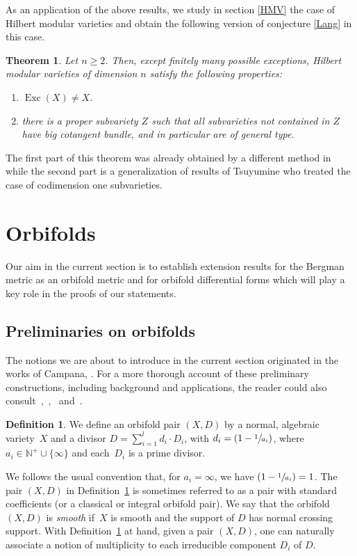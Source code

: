 \documentclass[10pt]{amsart}
\theoremstyle{plain}
\newtheorem{thma}{Theorem}
\theoremstyle{definition}
\newtheorem{definition}[theorem]{Definition}
\numberwithin{equation}{theorem}
\newenvironment{enumerateth}
{\bgroup\def\theenumi{\thetheorem.\arabic{enumi}}
\begin{enumerate}
\setcounter{enumi}{\value{equation}}}
{\setcounter{equation}{\value{enumi}}
\end{enumerate}
\egroup}
\DeclareMathOperator{\Exc}{Exc}
\begin{document}
As an application of the above results, we study in section \ref{HMV} the case of Hilbert modular varieties and obtain the following version of conjecture \ref{Lang} in this case.

\begin{thma}\label{th:D}
Let $n \geq 2$. Then, except finitely many possible exceptions, Hilbert modular varieties of dimension $n$ satisfy the following properties:
\begin{enumerateth}
\item $\Exc(X) \neq X$.
\item there is a proper subvariety $Z$ such that all subvarieties not contained in $Z$ have big cotangent bundle, and in particular are of general type.
\end{enumerateth}
\end{thma}

The first part of this theorem was already obtained by a different method in \cite{RT} while the second part is a generalization of results of Tsuyumine \cite{Tsu86} who treated the case of codimension one subvarieties.

\section{Orbifolds}\label{extension}

Our aim in the current section is to establish extension results for the Bergman metric as an orbifold metric and
for orbifold differential forms which will play a key role in the proofs of our statements.

\subsection{Preliminaries on orbifolds}
The notions we are about to introduce in the current section originated in the
works of Campana, \cf \cite{Cam04}. For a more thorough account of these
preliminary constructions, including background and applications,
the reader could also consult~\cite{MR2860268},~\cite{Taji16},~\cite{CKT16} and~\cite{GT16}.

\begin{definition}\label{def:pair}
We define an orbifold pair $(X,D)$ by a normal, algebraic variety~$X$ and
a divisor $D = \sum_{i=1}^l d_i \cdot D_i$, with $d_i = (1- \sfrac{1}{a_i})$, where
$a_i \in \mathbb N^+ \cup \{ \infty \}$ and each~$D_i$ is a prime divisor.
\end{definition}

We follows the usual convention that, for $a_i = \infty$, we have $(1- \sfrac{1}{a_i}) = 1$. The pair $(X,D)$ in Definition~\ref{def:pair} is sometimes referred to as a pair with standard coefficients
(or a classical or integral orbifold pair). We say that the orbifold $(X,D)$ is \emph{smooth} if~$X$ is smooth and the support of $D$ has normal crossing support. With Definition~\ref{def:pair} at hand, given a pair $(X,D)$, one can naturally associate a notion of multiplicity to each irreducible component $D_i$ of $D$.
\end{document}
